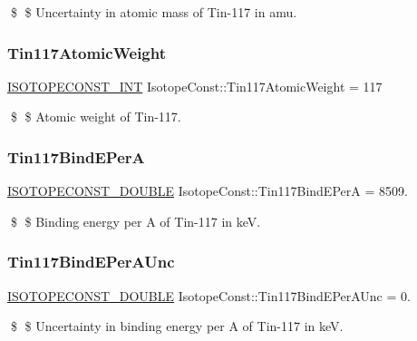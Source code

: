 \$ \$ Uncertainty in atomic mass of Tin-\/117 in amu. \mbox{\label{group___isotope_const-_tin-_sn117_ga061b2b0036867e468580428f4c07f888}} 
\subsubsection{\texorpdfstring{Tin117\+Atomic\+Weight}{Tin117AtomicWeight}}
{\footnotesize\ttfamily \mbox{\hyperlink{group___isotope_const-_macros_ga5f18360b3e99483a35c32d789e62621c}{I\+S\+O\+T\+O\+P\+E\+C\+O\+N\+S\+T\+\_\+\+I\+NT}} Isotope\+Const\+::\+Tin117\+Atomic\+Weight = 117}

\$ \$ Atomic weight of Tin-\/117. \mbox{\label{group___isotope_const-_tin-_sn117_ga421a7b66006d0292301fc8fefbb2b305}} 
\subsubsection{\texorpdfstring{Tin117\+Bind\+E\+PerA}{Tin117BindEPerA}}
{\footnotesize\ttfamily \mbox{\hyperlink{group___isotope_const-_macros_ga8f45a7272ce02c0b4c65c44636ed719a}{I\+S\+O\+T\+O\+P\+E\+C\+O\+N\+S\+T\+\_\+\+D\+O\+U\+B\+LE}} Isotope\+Const\+::\+Tin117\+Bind\+E\+PerA = 8509.}

\$ \$ Binding energy per A of Tin-\/117 in keV. \mbox{\label{group___isotope_const-_tin-_sn117_ga176e216ad5da2ae9d4d3178bc4acd9a3}} 
\subsubsection{\texorpdfstring{Tin117\+Bind\+E\+Per\+A\+Unc}{Tin117BindEPerAUnc}}
{\footnotesize\ttfamily \mbox{\hyperlink{group___isotope_const-_macros_ga8f45a7272ce02c0b4c65c44636ed719a}{I\+S\+O\+T\+O\+P\+E\+C\+O\+N\+S\+T\+\_\+\+D\+O\+U\+B\+LE}} Isotope\+Const\+::\+Tin117\+Bind\+E\+Per\+A\+Unc = 0.}

\$ \$ Uncertainty in binding energy per A of Tin-\/117 in keV. \mbox{\label{group___isotope_const-_tin-_sn117_gaa14f4a5e67ac1a762da15d37d712e333}} 
